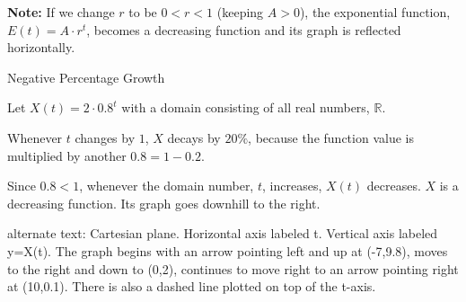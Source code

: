 \documentclass{ximera}
\begin{document}
\textbf{Note:} If we change $r$ to be $0 < r < 1$ (keeping $A>0$), the exponential function, $E(t) = A \cdot r^t$, becomes a decreasing function and its graph is reflected horizontally.







\begin{example} Negative Percentage Growth

Let $X(t) = 2 \cdot 0.8^t$ with a domain consisting of all real numbers, $\mathbb{R}$. 

Whenever $t$ changes by $1$, $X$ decays by $20\%$, because the function value is multiplied by another $0.8 = 1 - 0.2$.



Since $0.8 < 1$, whenever the domain number, $t$, increases, $X(t)$ decreases.  $X$ is a decreasing function.  Its graph goes downhill to the right.









\begin{image}
\end{image}





\textcolor{gray!90}{alternate text: Cartesian plane. Horizontal axis labeled t. Vertical axis labeled y=X(t).  The graph begins with an arrow pointing left and up at (-7,9.8), moves to the right and down to (0,2), continues to move right to an arrow pointing right at (10,0.1). There is also a dashed line plotted on top of the t-axis.}


\end{example}
\end{document}
